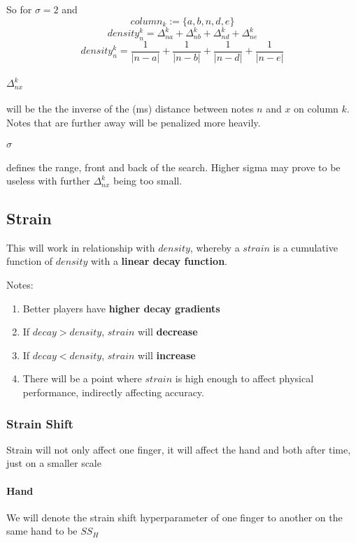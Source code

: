 So for $\sigma = 2$ and 
$$ column_k := \lbrace a, b, n, d, e\rbrace$$
$$ density_n^k = \Delta_{na}^k + \Delta_{nb}^k + \Delta_{nd}^k + \Delta_{ne}^k $$
$$ density_n^k = \frac{1}{|n-a|} + \frac{1}{|n-b|} + \frac{1}{|n-d|} + \frac{1}{|n-e|}$$

\paragraph{$\Delta_{nx}^k$} will be the the inverse of the (ms) distance between notes $n$ and $x$ on column $k$. Notes that are further away will be penalized more heavily.

\paragraph{$\sigma$} defines the range, front and back of the search. Higher sigma may prove to be useless with further $\Delta_{nx}^k$ being too small.

\subsection{Strain}

This will work in relationship with $density$, whereby a $strain$ is a cumulative function of $density$ with a \textbf{linear decay function}.

Notes:
\begin{enumerate}
	\item Better players have \textbf{higher decay gradients}
	\item If $decay > density$, $strain$ will \textbf{decrease}
	\item If $decay < density$, $strain$ will \textbf{increase}
	\item There will be a point where $strain$ is high enough to affect physical performance, indirectly affecting accuracy.
\end{enumerate}

\subsubsection{Strain Shift}

Strain will not only affect one finger, it will affect the hand and both after time, just on a smaller scale

\paragraph{Hand} We will denote the strain shift hyperparameter of one finger to another on the same hand to be $SS_H$
